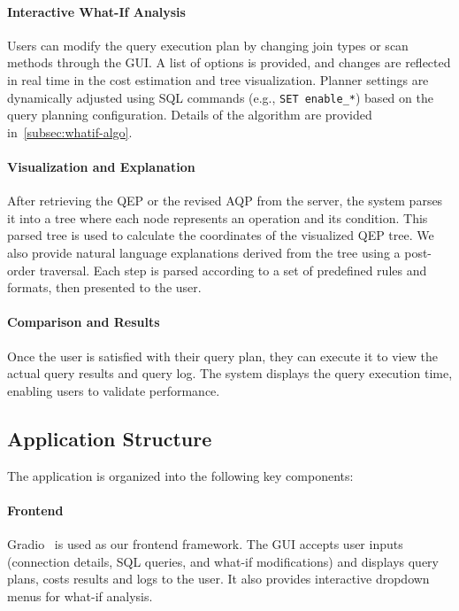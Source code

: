 \paragraph{Interactive What-If Analysis} Users can modify the query execution plan by changing join types or scan methods through the GUI. A list of options is provided, and changes are reflected in real time in the cost estimation and tree visualization. Planner settings are dynamically adjusted using SQL commands (e.g., \texttt{SET enable\_*}) based on the query planning configuration. Details of the algorithm are provided in~\cref{subsec:whatif-algo}.

\paragraph{Visualization and Explanation} After retrieving the QEP or the revised AQP from the server, the system parses it into a tree where each node represents an operation and its condition. This parsed tree is used to calculate the coordinates of the visualized QEP tree. We also provide natural language explanations derived from the tree using a post-order traversal. Each step is parsed according to a set of predefined rules and formats, then presented to the user.

\paragraph{Comparison and Results} Once the user is satisfied with their query plan, they can execute it to view the actual query results and query log. The system displays the query execution time, enabling users to validate performance.

\subsection{Application Structure}

The application is organized into the following key components:

\paragraph{Frontend} Gradio~\cite{abid2019gradio} is used as our frontend framework. The GUI accepts user inputs (connection details, SQL queries, and what-if modifications) and displays query plans, costs results and logs to the user. It also provides interactive dropdown menus for what-if analysis.

